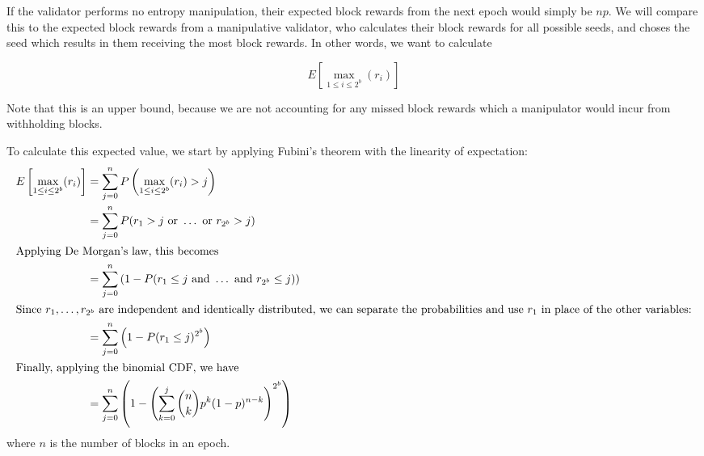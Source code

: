 If the validator performs no entropy manipulation, their expected block rewards from the next epoch would simply be $n p$. We will compare this to the expected block rewards from a manipulative validator, who calculates their block rewards for all possible seeds, and choses the seed which results in them receiving the most block rewards. In other words, we want to calculate

$$ E\left[ \max_{1 \le i \le 2^b}(r_i) \right] $$

Note that this is an upper bound, because we are not accounting for any missed block rewards which a manipulator would incur from withholding blocks.

To calculate this expected value, we start by applying Fubini's theorem with the linearity of expectation:
\begin{align*}
  E\left[ \max_{1 \le i \le 2^b}(r_i) \right] &= \sum_{j=0}^{n} P\left( \max_{1 \le i \le 2^b}(r_i) > j \right) \\
  &= \sum_{j=0}^{n} P(r_1 > j \text{ or } \dots \text { or } r_{2^b} > j) \\
  \intertext{Applying De Morgan's law, this becomes}
  &= \sum_{j=0}^{n} \left( 1 - P(r_1 \le j \text{ and } \dots \text { and } r_{2^b} \le j) \right) \\
  \intertext{Since $r_1, \dots, r_{2^b}$ are independent and identically distributed, we can separate the probabilities and use $r_1$ in place of the other variables:}
  &= \sum_{j=0}^{n} \left( 1 - P(r_1 \le j)^{2^b} \right) \\
  \intertext{Finally, applying the binomial CDF, we have}
  &= \sum_{j=0}^{n} \left( 1 - \left( \sum_{k=0}^{j} \binom{n}{k} p^k (1-p)^{n-k} \right)^{2^b} \right)
\end{align*}
where $n$ is the number of blocks in an epoch.

